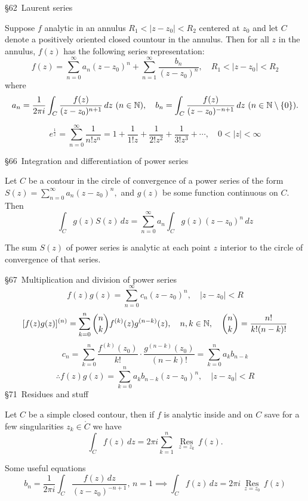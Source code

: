 \Large{\S 62}\normalsize \ 
Laurent series
\begin{theorem}
    Suppose $f$ analytic in an annulus $R_1<|z-z_0|<R_2$ centered at $z_0$ and let $C$ denote a positively oriented closed countour in the annulus. Then for all $z$ in the annulus, $f(z)$ has the following series representation:
    \[
        f(z)=\sum_{n=0}^{\infty} a_n (z-z_0)^n +\sum_{n=1}^{\infty} \frac{b_n }{(z-z_0)^n },\quad R_1<|z-z_0|<R_2
    \] where \[
    a_n =\frac{1}{2\pi i}\int_{C}^{} \frac{f(z)}{(z-z_0)^{n+1}} \, dz \ (n\in \mathbb{N}),\quad b_n =\int_{C}^{} \frac{f(z)}{(z-z_0)^{-n+1}} \, dz \ (n\in \mathbb{N}\setminus \{0\} ).
    \] 
\end{theorem}
\begin{example}
\[
e^{\frac{1}{z}}=\sum_{n=0}^{\infty} \frac{1}{n!z^n }=1+\frac{1}{1!z}+\frac{1}{2!z^2}+\frac{1}{3!z^3}+\cdots, \quad 0<|z|<\infty
\] 
\end{example}
\Large{\S 66}\normalsize \
Integration and differentiation of power series
\begin{theorem}
    Let $C$ be a contour in the circle of convergence of a power series of the form $S(z)=\sum_{n=0}^{\infty} a_n (z-z_0)^n ,$ and $g(z)$ be some function continuous on $C$. Then 
    \[
        \int_{C}^{} g(z)S(z) \, dz=\sum_{n=0}^{\infty} a_n \int_{C}^{} g(z)(z-z_0)^n  \, dz
    \] 
\end{theorem}
\begin{cor}
    The sum $S(z)$ of power series is analytic at each point $z$ interior to the circle of convergence of that series.
\end{cor}
\Large{\S 67}\normalsize \
Multiplication and division of power series
\[
    f(z)g(z)=\sum_{n=0}^{\infty} c_n (z-z_0)^n ,\quad |z-z_0|<R
\] 
\[
    [f(z)g(z)]^{(n)}=\sum_{k=0}^{n} {n \choose k}f^{(k)}(z)g^{(n-k)}(z),\quad n,k\in \mathbb{N},\quad {n\choose k}=\frac{n!}{k!(n-k)!}
\] 
\[
    c_n =\sum_{k=0}^{n} \frac{f^{(k)}(z_0)}{k!}\cdot \frac{g^{(n-k)}(z_0)}{(n-k)!}=\sum_{k=0}^{n} a_kb_{n-k}
\] 
\[
    \therefore f(z)g(z)=\sum_{k=0}^{n} a_kb_{n-k}(z-z_0)^n ,\quad |z-z_0|<R
\] 
\Large{\S 71}\normalsize \
Residues and stuff
\begin{theorem}[Cauchy's residue theorem]
   Let $C$ be a simple closed contour, then if $f$ is analytic inside and on $C$ save for a few singularities $z_k\in \mathring C$ we have \[
       \int_{C}^{} f(z) \, dz=2\pi i \sum_{k=1}^{n} \, \underset{z=z_k}{\operatorname{R es}} \, f(z).
   \] 
\end{theorem}
Some useful equations
\[
    b_n =\frac{1}{2\pi i}\int_{C}^{} \frac{f(z) \, dz}{(z-z_0)^{-n+1}},\, n=1 \implies \int_{C}^{} f(z) \, dz=2\pi i\,\underset{z=z_0}{\operatorname{R es} }\,f(z)
\] 
